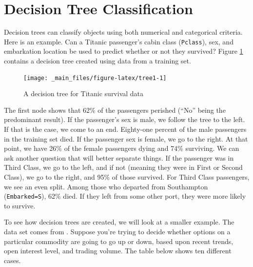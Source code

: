 \documentclass[
]{book}
\theoremstyle{definition}
\theoremstyle{definition}
\theoremstyle{definition}
\theoremstyle{definition}
\theoremstyle{remark}
\begin{document}
\section{Decision Tree Classification}\label{decision-tree-classification}

Decision trees can classify objects using both numerical and categorical criteria. Here is an example. Can a Titanic passenger's cabin class (\texttt{Pclass}), sex, and embarkation location be used to predict whether or not they survived? Figure \ref{fig:tree1} contains a decision tree created using data from a training set.

\pagebreak

\begin{figure}

{\centering \texttt{[image: \_main\_files/figure-latex/tree1-1]} 

}

\caption{A decision tree for Titanic survival data}\label{fig:tree1}
\end{figure}

The first node shows that 62\% of the passengers perished (``No'' being the predominant result). If the passenger's sex is male, we follow the tree to the left. If that is the case, we come to an end. Eighty-one percent of the male passengers in the training set died. If the passenger sex is female, we go to the right. At that point, we have 26\% of the female passengers dying and 74\% surviving. We can ask another question that will better separate things. If the passenger was in Third Class, we go to the left, and if not (meaning they were in First or Second Class), we go to the right, and 95\% of those survived. For Third Class passengers, we see an even split. Among those who departed from Southampton (\texttt{Embarked=S}), 62\% died. If they left from some other port, they were more likely to survive.

To see how decision trees are created, we will look at a smaller example. The data set comes from \autocite{gini}. Suppose you're trying to decide whether options on a particular commodity are going to go up or down, based upon recent trends, open interest level, and trading volume. The table below shows ten different cases.
\end{document}
